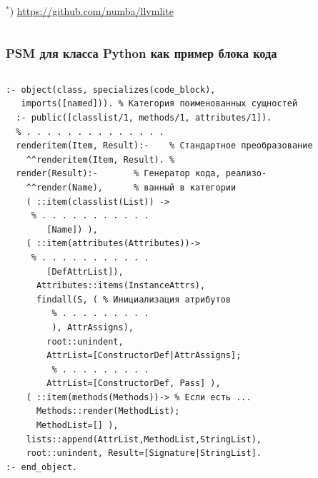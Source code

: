 \documentclass[10pt]{beamer}
\begin{document}
\begin{frame}[fragile]
\begin{columns}
\begin{column}{0.4\textwidth}
  ${}^*$) \url{https://github.com/numba/llvmlite}
    \end{column}
  \end{columns}
\end{frame}

\begin{frame}[fragile]
  \frametitle{PSM для класса Python как пример блока кода}
  \begin{columns}
    \begin{column}{0.6\textwidth}
      \flushleft
\begin{verbatim}
:- object(class, specializes(code_block),
   imports([named])). % Категория поименованных сущностей
  :- public([classlist/1, methods/1, attributes/1]).
  % . . . . . . . . . . . . . .
  renderitem(Item, Result):-    % Стандартное преобразование
    ^^renderitem(Item, Result). %
  render(Result):-       % Генератор кода, реализо-
    ^^render(Name),      % ванный в категории
    ( ::item(classlist(List)) ->
     % . . . . . . . . . . .
        [Name]) ),
    ( ::item(attributes(Attributes))->
     % . . . . . . . . . . .
        [DefAttrList]),
      Attributes::items(InstanceAttrs),
      findall(S, ( % Инициализация атрибутов
         % . . . . . . . . .
         ), AttrAssigns),
        root::unindent,
        AttrList=[ConstructorDef|AttrAssigns];
         % . . . . . . . . .
        AttrList=[ConstructorDef, Pass] ),
    ( ::item(methods(Methods))-> % Если есть ...
      Methods::render(MethodList);
      MethodList=[] ),
    lists::append(AttrList,MethodList,StringList),
    root::unindent, Result=[Signature|StringList].
:- end_object.
\end{verbatim}
    \end{column}
    \begin{column}{0.4\linewidth}

\end{column}
\end{columns}
\end{frame}
\end{document}
